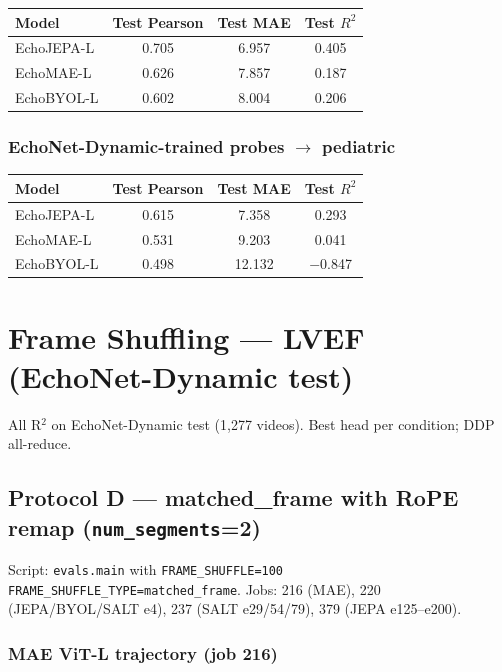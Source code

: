 \documentclass{article}
\begin{document}
\begin{center}
\begin{tabular}{lccc}
\toprule
Model & Test Pearson & Test MAE & Test $R^2$ \\
\midrule
EchoJEPA-L & 0.705 & 6.957 & 0.405 \\
EchoMAE-L  & 0.626 & 7.857 & 0.187 \\
EchoBYOL-L & 0.602 & 8.004 & 0.206 \\
\bottomrule
\end{tabular}
\end{center}

\subsubsection{EchoNet-Dynamic-trained probes $\to$ pediatric}

\begin{center}
\begin{tabular}{lccc}
\toprule
Model & Test Pearson & Test MAE & Test $R^2$ \\
\midrule
EchoJEPA-L & 0.615 & 7.358 & 0.293 \\
EchoMAE-L  & 0.531 & 9.203 & 0.041 \\
EchoBYOL-L & 0.498 & 12.132 & $-$0.847 \\
\bottomrule
\end{tabular}
\end{center}

\section{Frame Shuffling --- LVEF (EchoNet-Dynamic test)}\label{sec:frameshuf_end}

All R$^2$ on EchoNet-Dynamic test (1{,}277 videos). Best head per condition; DDP all-reduce.

\subsection{Protocol D --- matched\_frame with RoPE remap (\texttt{num\_segments}=2)}

Script: \texttt{evals.main} with \texttt{FRAME\_SHUFFLE=100 FRAME\_SHUFFLE\_TYPE=matched\_frame}.
Jobs: 216 (MAE), 220 (JEPA/BYOL/SALT e4), 237 (SALT e29/54/79), 379 (JEPA e125--e200).

\subsubsection{MAE ViT-L trajectory (job 216)}
\end{document}
